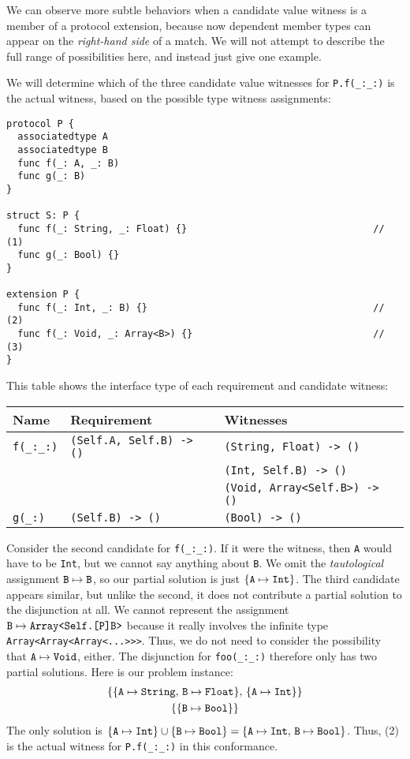 \documentclass[../generics]{subfiles}
\begin{document}
We can observe more subtle behaviors when a candidate value witness is a member of a protocol extension, because now dependent member types can appear on the \emph{right-hand side} of a match. We will not attempt to describe the full range of possibilities here, and instead just give one example.

\begin{example}
We will determine which of the three candidate value witnesses for \verb|P.f(_:_:)| is the actual witness, based on the possible type witness assignments:
\begin{Verbatim}
protocol P {
  associatedtype A
  associatedtype B
  func f(_: A, _: B)
  func g(_: B)
}

struct S: P {
  func f(_: String, _: Float) {}                                 // (1)
  func g(_: Bool) {}
}

extension P {
  func f(_: Int, _: B) {}                                        // (2)
  func f(_: Void, _: Array<B>) {}                                // (3)
}
\end{Verbatim}
This table shows the interface type of each requirement and candidate witness:
\begin{center}
\begin{tabular}{lll}
\toprule
\textbf{Name}&\textbf{Requirement}&\textbf{Witnesses}\\
\midrule
\verb|f(_:_:)|&\verb|(Self.A, Self.B) -> ()|&\verb|(String, Float) -> ()|\\
&&\verb|(Int, Self.B) -> ()|\\
&&\verb|(Void, Array<Self.B>) -> ()|\\
\midrule
\verb|g(_:)|&\verb|(Self.B) -> ()|&\verb|(Bool) -> ()|\\
\bottomrule
\end{tabular}
\end{center}

Consider the second candidate for \verb|f(_:_:)|. If it were the witness, then \texttt{A} would have to be \texttt{Int}, but we cannot say anything about \texttt{B}. We omit the \emph{tautological} assignment $\texttt{B} \mapsto \texttt{B}$, so our partial solution is just $\{\texttt{A} \mapsto \texttt{Int}\}$. The third candidate appears similar, but unlike the second, it does not contribute a partial solution to the disjunction at all. We cannot represent the assignment $\texttt{B} \mapsto \texttt{Array<Self.[P]B>}$ because it really involves the infinite type \texttt{Array<Array<Array<...>>>}. Thus, we do not need to consider the possibility that $\texttt{A} \mapsto \texttt{Void}$, either. The disjunction for \verb|foo(_:_:)| therefore only has two partial solutions. Here is our problem instance:
\begin{gather*}
\{ \{ \texttt{A} \mapsto \texttt{String},\, \texttt{B} \mapsto \texttt{Float} \},\, \{ \texttt{A} \mapsto \texttt{Int} \}\}\\
\{ \{ \texttt{B} \mapsto \texttt{Bool} \} \}
\end{gather*}
The only solution is $\{ \texttt{A} \mapsto \texttt{Int} \} \cup \{ \texttt{B} \mapsto \texttt{Bool} \} = \{ \texttt{A} \mapsto \texttt{Int},\, \texttt{B} \mapsto \texttt{Bool}\}$. Thus, (2) is the actual witness for \verb|P.f(_:_:)| in this conformance.
\end{example}
\end{document}
